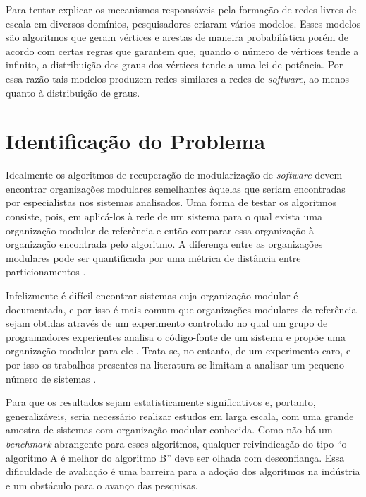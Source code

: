 \documentclass[12pt]{article}
\begin{document}
Para tentar explicar os mecanismos responsáveis pela formação de redes livres de
escala em diversos domínios, pesquisadores criaram vários modelos.  Esses
modelos são algoritmos que geram vértices e arestas de maneira probabilística
porém de acordo com certas regras que garantem que, quando o número de vértices
tende a infinito, a distribuição dos graus dos vértices tende a uma lei de
potência. Por essa razão tais modelos produzem redes similares a redes de
\emph{software}, ao menos quanto à distribuição de graus.

\section{Identificação do Problema} 


Idealmente os algoritmos de recuperação de modularização de \emph{software}
devem encontrar organizações modulares semelhantes àquelas que seriam
encontradas por especialistas nos sistemas analisados. Uma forma de testar os
algoritmos consiste, pois, em aplicá-los à rede de um sistema para o qual
exista uma organização modular de referência e então comparar essa organização
à organização encontrada pelo algoritmo. A diferença entre as organizações
modulares pode ser quantificada por uma métrica de distância entre
particionamentos \cite{Tzerpos1999}.

Infelizmente é difícil encontrar sistemas cuja organização modular é
documentada, e por isso é mais comum que organizações modulares de referência
sejam obtidas através de um experimento controlado no qual um grupo de
programadores experientes analisa o código-fonte de um sistema e propõe uma
organização modular para ele \cite{Koschke2000}. Trata-se, no entanto, de um
experimento caro, e por isso os trabalhos presentes na literatura se limitam a
analisar um pequeno número de sistemas \cite{Wu2005}.



Para que os resultados sejam estatisticamente significativos e, portanto,
generalizáveis, seria necessário realizar estudos em larga escala, com uma
grande amostra de sistemas com organização modular conhecida. Como não há um
\emph{benchmark} abrangente para esses algoritmos, qualquer reivindicação do
tipo ``o algoritmo A é melhor do algoritmo B'' deve ser olhada com
desconfiança. Essa dificuldade de avaliação é uma barreira para a
adoção dos algoritmos na indústria e um obstáculo para o avanço das pesquisas.
\end{document}
